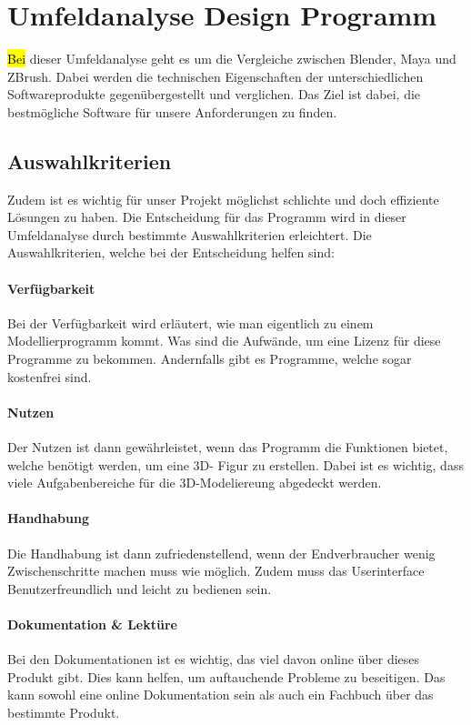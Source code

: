 
\section{Umfeldanalyse Design Programm}
\hl{Bei} dieser Umfeldanalyse geht es um die Vergleiche zwischen Blender, Maya und ZBrush. Dabei werden die technischen Eigenschaften der unterschiedlichen Softwareprodukte gegenübergestellt und verglichen. Das Ziel ist dabei, die bestmögliche Software für unsere Anforderungen zu finden.

\subsection{Auswahlkriterien}
Zudem ist es wichtig für unser Projekt möglichst schlichte und doch effiziente Lösungen zu haben. Die Entscheidung für das Programm wird in dieser Umfeldanalyse durch bestimmte Auswahlkriterien erleichtert. Die Auswahlkriterien, welche bei der Entscheidung helfen sind: 

\paragraph{Verfügbarkeit}
Bei der Verfügbarkeit wird erläutert, wie man eigentlich zu einem Modellierprogramm kommt. Was sind die Aufwände, um eine Lizenz für diese Programme zu bekommen. Andernfalls gibt es Programme, welche sogar kostenfrei sind.

\paragraph{Nutzen}
Der Nutzen ist dann gewährleistet, wenn das Programm die Funktionen bietet, welche benötigt werden, um eine 3D- Figur zu erstellen. Dabei ist es wichtig, dass viele Aufgabenbereiche für die 3D-Modeliereung abgedeckt werden.

\paragraph{Handhabung}
Die Handhabung ist dann zufriedenstellend, wenn der Endverbraucher wenig Zwischenschritte machen muss wie möglich. Zudem muss das Userinterface Benutzerfreundlich und leicht zu bedienen sein.

\paragraph{Dokumentation \& Lektüre}
Bei den Dokumentationen ist es wichtig, das viel davon online über dieses Produkt gibt. Dies kann helfen, um auftauchende Probleme zu beseitigen. Das kann sowohl eine online Dokumentation sein als auch ein Fachbuch über das bestimmte Produkt.

